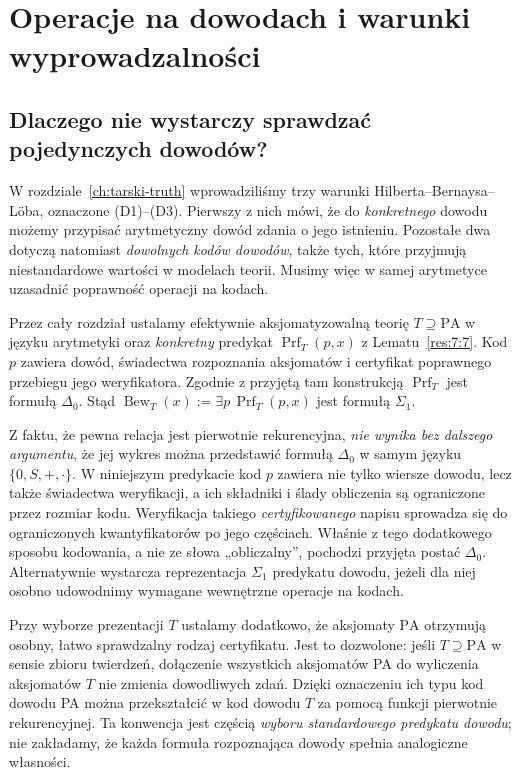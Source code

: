 \chapter{Operacje na dowodach i warunki wyprowadzalności}\label{ch:derivability-proof}

\section{Dlaczego nie wystarczy sprawdzać pojedynczych dowodów?}
W rozdziale~\ref{ch:tarski-truth} wprowadziliśmy trzy warunki
Hilberta--Bernaysa--Löba, oznaczone (D1)--(D3).
Pierwszy z nich mówi, że do \emph{konkretnego} dowodu możemy
przypisać arytmetyczny dowód zdania o jego istnieniu. Pozostałe
dwa dotyczą natomiast \emph{dowolnych kodów dowodów}, także tych,
które przyjmują niestandardowe wartości w modelach teorii. Musimy więc
w samej arytmetyce uzasadnić poprawność operacji na kodach.

Przez cały rozdział ustalamy efektywnie aksjomatyzowalną teorię
$T\supseteq\mathrm{PA}$ w języku arytmetyki oraz \emph{konkretny}
predykat $\operatorname{Prf}_T(p,x)$ z Lematu~\ref{res:7:7}.
Kod $p$ zawiera dowód, świadectwa rozpoznania aksjomatów i
certyfikat poprawnego przebiegu jego weryfikatora. Zgodnie
z przyjętą tam konstrukcją $\operatorname{Prf}_T$ jest formułą $\Delta_0$.
Stąd $\operatorname{Bew}_T(x):=\exists p\,\operatorname{Prf}_T(p,x)$
jest formułą $\Sigma_1$.

\begin{uwaga}
Z faktu, że pewna relacja jest pierwotnie rekurencyjna, \emph{nie wynika
bez dalszego argumentu}, że jej wykres można przedstawić formułą
$\Delta_0$ w samym języku $\{0,S,+,\cdot\}$. W niniejszym
predykacie kod $p$ zawiera nie tylko wiersze dowodu, lecz także
świadectwa weryfikacji, a ich składniki i ślady obliczenia są
ograniczone przez rozmiar kodu. Weryfikacja takiego
\emph{certyfikowanego} napisu sprowadza się do ograniczonych
kwantyfikatorów po jego częściach. Właśnie z tego dodatkowego
sposobu kodowania, a nie ze słowa „obliczalny”, pochodzi
przyjęta postać $\Delta_0$. Alternatywnie wystarcza reprezentacja
$\Sigma_1$ predykatu dowodu, jeżeli dla niej osobno udowodnimy
wymagane wewnętrzne operacje na kodach.
\end{uwaga}

Przy wyborze prezentacji $T$ ustalamy dodatkowo, że aksjomaty
$\mathrm{PA}$ otrzymują osobny, łatwo sprawdzalny rodzaj
certyfikatu. Jest to dozwolone: jeśli $T\supseteq\mathrm{PA}$
w sensie zbioru twierdzeń, dołączenie wszystkich aksjomatów
PA do wyliczenia aksjomatów $T$ nie zmienia dowodliwych zdań.
Dzięki oznaczeniu ich typu kod dowodu PA można przekształcić
w kod dowodu $T$ za pomocą funkcji pierwotnie rekurencyjnej.
Ta konwencja jest częścią \emph{wyboru standardowego
predykatu dowodu}; nie zakładamy, że każda formuła
rozpoznająca dowody spełnia analogiczne własności.

